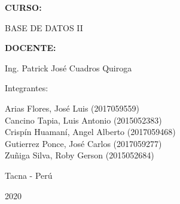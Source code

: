\documentclass[12pt,letterpaper]{article}
\begin{document}
\begin{titlepage}
\begin{center}
\vspace*{0.2in}
\begin{Large}
\textbf{CURSO:} \\
\end{Large}

\vspace*{0.1in}
\begin{large}
BASE DE DATOS II\\
\end{large}

\vspace*{0.2in}
\begin{Large}
\textbf{DOCENTE:} \\
\end{Large}

\vspace*{0.1in}
\begin{large}
Ing. Patrick José Cuadros Quiroga\\
\end{large}

\vspace*{0.2in}
\vspace*{0.1in}
\begin{large}
Integrantes: \\
\begin{flushleft}
Arias Flores, José Luis 			\hfill	(2017059559) \\
Cancino Tapia, Luis Antonio 		\hfill	(2015052383) \\
Crispín Huamaní, Angel Alberto      \hfill	(2017059468) \\
Gutierrez Ponce, José Carlos  		\hfill	(2017059277) \\
Zuñiga Silva, Roby Gerson       	\hfill	(2015052684) \\

\end{flushleft}
\end{large}
\vspace*{0.1in}
\begin{large}
Tacna - Perú\\
\end{large}
\vspace*{0.1in}
\begin{large}
2020\\
\end{large}

\end{center}

\end{titlepage}


\end{document}
